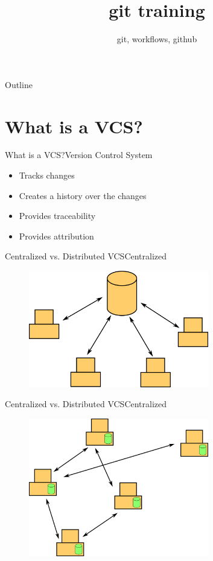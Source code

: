 \documentclass{beamer}
\title {git training}
\subtitle{git, workflows, github}
\begin{document}
\begin{frame}
\titlepage
\end{frame}

\begin{frame}{Outline}
    \tableofcontents
\end{frame}

\section{What is a VCS?}
\begin{frame}{What is a VCS?}{Version Control System}
\begin{itemize}
	\item Tracks changes
	\item Creates a history over the changes
	\item Provides traceability
	\item Provides attribution
\end{itemize}
\end{frame}

\begin{frame}{Centralized vs. Distributed VCS}{Centralized}
\begin{figure}
	\centering
	\includegraphics[width=0.7\textwidth]{01_centralized_vcs}
\end{figure}
\end{frame}

\begin{frame}{Centralized vs. Distributed VCS}{Centralized}
\begin{figure}
	\centering
	\includegraphics[width=0.7\textwidth]{02_distributed_vcs}
\end{figure}
\end{frame}
\end{document}
